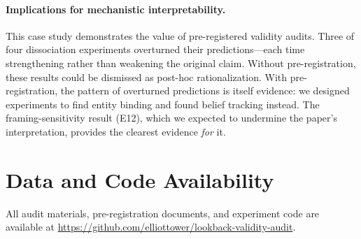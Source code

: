 \documentclass[11pt]{article}
\begin{document}
\paragraph{Implications for mechanistic interpretability.}
This case study demonstrates the value of pre-registered validity audits. Three of four dissociation experiments overturned their predictions---each time strengthening rather than weakening the original claim. Without pre-registration, these results could be dismissed as post-hoc rationalization. With pre-registration, the pattern of overturned predictions is itself evidence: we designed experiments to find entity binding and found belief tracking instead. The framing-sensitivity result (E12), which we expected to undermine the paper's interpretation, provides the clearest evidence \emph{for} it.


\section*{Data and Code Availability}

All audit materials, pre-registration documents, and experiment code are available at \url{https://github.com/elliottower/lookback-validity-audit}.




\end{document}
